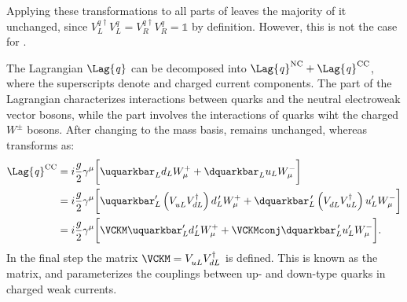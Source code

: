 Applying these transformations to all parts of  leaves the majority of it unchanged, since
$V_{L}^{q\dagger} V_{L}^{q} = V_{R}^{q\dagger} V_{R}^{q} = \mathds{1}$ by definition.
However, this is not the case for .

The Lagrangian $\Lag{\it q}$ can be decomposed into
$\Lag{\it q}^\mathrm{NC}+\Lag{\it q}^\mathrm{CC}$, where the
superscripts denote \NC and charged current \CC components.
The \NC part of the Lagrangian characterizes interactions between quarks and the neutral electroweak
vector bosons, while the \CC part involves the interactions of quarks wiht the charged $W^\pm$
bosons.
After changing to the mass basis,  remains unchanged, whereas 
transforms as:
\begin{align}
  \Lag{\it q}^\mathrm{CC}
  &= i\frac{g}{2}\gamma^\mu
  \bigg[\uquarkbar_Ld_LW^+_\mu + \dquarkbar_Lu_LW^-_\mu
  \bigg]  \nonumber\\
  &= i\frac{g}{2}\gamma^\mu
  \bigg[
    \uquarkbar_L^\prime\left(V_{uL}^{\phantom{\dagger}}V_{dL}^\dagger\right)d_L^{\,\prime} W^+_\mu +
    \dquarkbar_L^{\,\prime}\left(V_{dL}^{\phantom{\dagger}}V_{uL}^\dagger\right)u_L^\prime W^-_\mu
  \bigg]  \nonumber\\
  &= i\frac{g}{2}\gamma^\mu
  \bigg[
    \VCKM\uquarkbar_L^\prime d_L^{\,\prime} W^+_\mu +
    \VCKMconj\dquarkbar_L^{\,\prime} u_L^\prime W^-_\mu
  \bigg].
\end{align}
In the final step the matrix
$\VCKM=V^{\phantom{\dagger}}_{uL}V_{dL}^\dagger$ is defined.
This is known as the \ckm
matrix, and parameterizes the couplings between up- and down-type quarks in charged weak currents.



